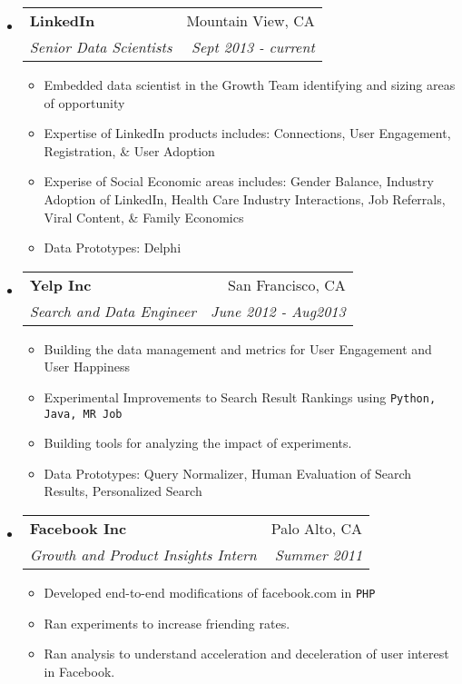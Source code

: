 \documentclass[letterpaper,11pt]{article}
\makeatletter
\newcommand{\resitem}[1]{\item #1 \vspace{-2pt}}
\newcommand{\ressubheading}[4]{

\begin{tabular*}{6.5in}{l@{\cftdotfill{\cftsecdotsep}\extracolsep{\fill}}r}

		\textbf{#1} & #2 \\

		\textit{#3} & \textit{#4} \\

\end{tabular*}\vspace{-6pt}}
\makeatother
\begin{document}
\begin{itemize}
\item 
	\ressubheading{\color{linkedincolor}LinkedIn}{Mountain View, CA}{Senior Data Scientists}{Sept 2013 - current}

	\begin{itemize}
		\resitem{Embedded data scientist in the Growth Team identifying and sizing areas of opportunity}

		\resitem{Expertise of LinkedIn products includes: Connections, User Engagement, Registration, \& User Adoption}

		\resitem{Experise of Social Economic areas includes: Gender Balance, Industry Adoption of LinkedIn, Health Care Industry Interactions, Job Referrals, Viral Content, \& Family Economics}

		\resitem{Data Prototypes: Delphi}
	\end{itemize}

\item 
	\ressubheading{\color{yelpcolor}Yelp Inc}{San Francisco, CA}{Search and Data Engineer}{June 2012 - Aug2013}

	\begin{itemize}
		\resitem{Building the data management and metrics for User Engagement and User Happiness}

		\resitem{Experimental Improvements to Search Result Rankings using \texttt{Python, Java, MR Job}}

		\resitem{Building tools for analyzing the impact of experiments.}

		\resitem{Data Prototypes: Query Normalizer, Human Evaluation of Search Results, Personalized Search}

	\end{itemize}


\item

	\ressubheading{\color{facebookcolor}Facebook Inc}{Palo Alto, CA}{Growth and Product Insights Intern}{Summer 2011}

	\begin{itemize}

		\resitem{Developed end-to-end modifications of facebook.com in \texttt{PHP}}

    		\resitem{Ran experiments to increase friending rates.}

		\resitem{Ran analysis to understand acceleration and deceleration of user interest in Facebook.}

	\end{itemize}



\end{itemize}
\end{document}
